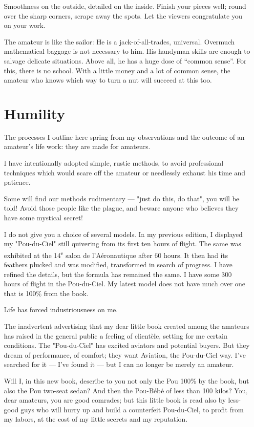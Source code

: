 \documentclass{book}
\begin{document}
Smoothness on the outside, detailed on the inside. Finish your pieces
well; round over the sharp corners, scrape away the spots.  Let the
viewers congratulate you on your work.

The amateur is like the sailor: He is a jack-of-all-trades,
universal. Overmuch mathematical baggage is not necessary to him. His
handyman skills are enough to salvage delicate situations. Above all,
he has a huge dose of ``common sense''. For this, there is no
school. With a little money and a lot of common sense, the amateur who
knows which way to turn a nut will succeed at this too.

\section{Humility}

The processes I outline here spring from my observations and the
outcome of an amateur's life work: they are made for amateurs.

I have intentionally adopted simple, rustic methods, to avoid
professional techniques which would scare off the amateur or
needlessly exhaust his time and patience.

Some will find our methods rudimentary --- "just do this, do that",
you will be told!  Avoid those people like the plague, and beware
anyone who believes they have some mystical secret!

I do not give you a choice of several models. In my previous edition,
I displayed my "Pou-du-Ciel" still quivering from its first ten hours
of flight. The same was exhibited at the 14\textsuperscript{e} salon
de l'A\'eronautique after 60 hours. It then had its feathers plucked
and was modified, transformed in search of progress. I have refined
the details, but the formula has remained the same. I have some 300
hours of flight in the Pou-du-Ciel. My latest model does not have much
over one that is 100\% from the book.

Life has forced industriousness on me.

The inadvertent advertising that my dear little book created among the
amateurs has raised in the general public a feeling of client\`ele,
setting for me certain conditions. The "Pou-du-Ciel" has excited
aviators and potential buyers. But they dream of performance, of
comfort; they want Aviation, the Pou-du-Ciel way. I've searched for it
--- I've found it --- but I can no longer be merely an amateur.

Will I, in this new book, describe to you not only the Pou 100\% by
the book, but also the Pou two-seat sedan? And then the Pou-B\'eb\'e
of less than 100 kilos? You, dear amateurs, you are good comrades; but
this little book is read also by less-good guys who will hurry up and
build a counterfeit Pou-du-Ciel, to profit from my labors, at the cost
of my little secrets and my reputation.
\end{document}
